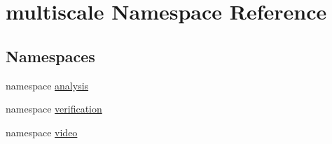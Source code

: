 \hypertarget{namespacemultiscale}{\section{multiscale Namespace Reference}
\label{namespacemultiscale}
}
\subsection*{Namespaces}
\begin{DoxyCompactItemize}
\item 
namespace \hyperlink{namespacemultiscale_1_1analysis}{analysis}
\item 
namespace \hyperlink{namespacemultiscale_1_1verification}{verification}
\item 
namespace \hyperlink{namespacemultiscale_1_1video}{video}
\end{DoxyCompactItemize}
